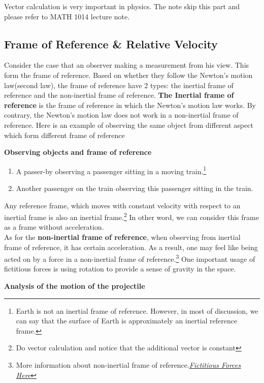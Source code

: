\documentclass[10pt, a4paper]{article}
\begin{document}
Vector calculation is very important in physics. The note skip this part and please refer to MATH 1014 lecture note.
\subsection{Frame of Reference \& Relative Velocity}
Consider the case that an observer making a measurement from his view. This form the frame of reference. Based on whether they follow the Newton's motion law(second law), the frame of reference have 2 types: the inertial frame of reference and the non-inertial frame of reference. \textbf{The Inertial frame of reference} is the frame of reference in which the Newton's motion law works. By contrary, the Newton's motion law does not work in a non-inertial frame of reference. Here is an example of observing the same object from different aspect which form different frame of reference
\begin{example}
\textbf{Observing objects and frame of reference}
    \begin{enumerate}
        \item A passer-by observing a passenger sitting in a moving train.\footnote{Earth is not an inertial frame of reference. However, in most of discussion, we can say that the surface of Earth is approximately an inertial reference frame. }
        \item Another passenger on the train observing this passenger sitting in the train.
    \end{enumerate}
\end{example}
    Any reference frame, which moves with constant velocity with respect to an inertial frame is also an inertial frame.\footnote{Do vector calculation and notice that the additional vector is constant} In other word, we can consider this frame as a frame without acceleration.\\

As for the \textbf{non-inertial frame of reference}, when observing from inertial frame of reference, it has certain acceleration. As a result, one may feel like being acted on by a force in a non-inertial frame of reference.\footnote{More information about non-inertial frame of reference.\href{https://zhuanlan.zhihu.com/p/62150288}{\uline{\textit{Fictitious Forces Here}}}}  One important usage of fictitious forces is using rotation to provide a sense of gravity in the space.
\begin{example}
    \textbf{Analysis of the motion of the projectile}
\end{example}
\clearpage
\end{document}
